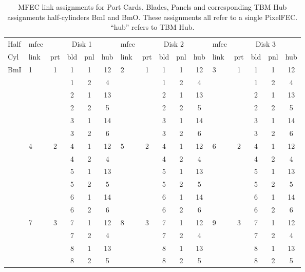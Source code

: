\documentclass{cmspaper}
\begin{document}
\begin{table}[htb]
    \caption{MFEC link assignments for Port Cards, Blades, Panels and 
corresponding TBM Hub assignments  half-cylinders BmI and BmO. 
These assignments
all refer to a single PixelFEC. ``hub'' refers to TBM Hub.}
    \label{table:pixelFEC_Bm}
    \begin{center}
      \begin{tabular}{l|l|cccc|l|cccc|l|cccc} \hline
Half & mfec &  \multicolumn{4}{|c|}{Disk 1} & mfec  & 
\multicolumn{4}{|c}{Disk 2}  &   
mfec  & \multicolumn{4}{|c|}{Disk 3} \\ 
Cyl     & link & prt & bld & pnl & hub & link & prt & bld & pnl & hub &
link & prt & bld & pnl & hub \\  \hline
BmI & 1 & 1 & 1 & 1 & 12 & 2  & 1 & 1 & 1& 12 & 3 & 1 & 1 & 1& 12 \\ \hline
    &   &   & 1 & 2 & 4  &    &   & 1 & 2&  4 &   &   & 1 & 2&  4 \\ \hline
    &   &   & 2 & 1 & 13 &    &   & 2 & 1& 13 &   &   & 2 & 1& 13 \\ \hline
    &   &   & 2 & 2 & 5  &    &   & 2 & 2& 5  &   &   & 2 & 2& 5 \\ \hline
    &   &   & 3 & 1 & 14 &    &   & 3 & 1& 14 &   &   & 3 & 1& 14 \\ \hline
    &   &   & 3 & 2 & 6  &    &   & 3 & 2& 6  &   &   & 3 & 2& 6 \\ \hline
    & 4 & 2 & 4 & 1 & 12 & 5  & 2 & 4 & 1& 12 & 6 & 2 & 4 & 1& 12 \\ \hline
    &   &   & 4 & 2 &  4 &    &   & 4 & 2&  4 &   &   & 4 & 2& 4 \\ \hline
    &   &   & 5 & 1 & 13 &    &   & 5 & 1& 13 &   &   & 5 & 1& 13 \\ \hline
    &   &   & 5 & 2 &  5 &    &   & 5 & 2&  5 &   &   & 5 & 2&  5 \\ \hline
    &   &   & 6 & 1 & 14 &    &   & 6 & 1& 14 &   &   & 6 & 1& 14 \\ \hline
    &   &   & 6 & 2 &  6 &    &   & 6 & 2&  6 &   &   & 6 & 2&  6 \\ \hline
    & 7 & 3 & 7 & 1 & 12 & 8  & 3 & 7 & 1& 12 & 9 & 3 & 7 & 1& 12 \\ \hline
    &   &   & 7 & 2 &  4 &    &   & 7 & 2&  4 &   &   & 7 & 2&  4 \\ \hline
    &   &   & 8 & 1 & 13 &    &   & 8 & 1& 13 &   &   & 8 & 1& 13 \\ \hline
    &   &   & 8 & 2 &  5 &    &   & 8 & 2&  5 &   &   & 8 & 2&  5 \\ \hline

\end{tabular}
\end{center}
\end{table}
\end{document}
